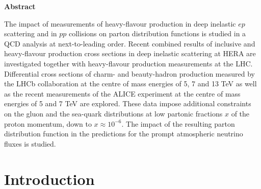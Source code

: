 \documentclass[12pt]{article}
\begin{document}
\begin{titlepage}
  \vspace{1.0cm}
\begin{center}
\large
{\bf Abstract}
\vspace{-0.2cm}
\end{center}
The impact of measurements of heavy-flavour production in deep inelastic $ep$ scattering and
in $pp$ collisions on parton distribution functions is studied in a QCD analysis at next-to-leading order. 
Recent combined results of inclusive and heavy-flavour production cross sections in deep inelastic scattering at HERA are 
investigated together with heavy-flavour production measurements at the LHC. Differential cross sections of charm- and 
beauty-hadron production measured by the LHCb collaboration at the centre of mass energies of 5, 7 and 13 TeV as well 
as the recent measurements of the ALICE experiment at the centre of mass energies of 5 and 7 TeV are explored. 
These data impose additional constraints on the gluon and the sea-quark distributions at low partonic fractions
$x$ of the proton momentum, down to $x\approx10^{-6}$. The impact of the resulting parton distribution function in the predictions for the prompt atmospheric neutrino fluxes is studied.


\vfill
\end{titlepage}


%
%
\newpage

\section{Introduction}
\label{sect:intro}
\end{document}
